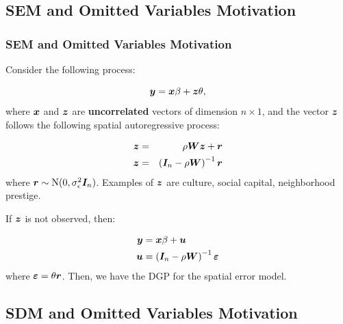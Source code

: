 \documentclass[english,10pt]{beamer}\usepackage[]{graphicx}\usepackage[]{xcolor}
\begin{document}
\subsection{SEM and Omitted Variables Motivation}

\begin{frame}
  \frametitle{SEM and Omitted Variables Motivation}
  Consider the following process:

\begin{equation*}
\bm y = \bm x\beta + \bm z\theta,
\end{equation*}
%
where $\bm x$ and $\bm z$ are \textbf{uncorrelated} vectors of dimension $n\times 1$, and the vector $\bm z$ follows the following spatial autoregressive process:

\begin{eqnarray*}
  \bm z &=& \rho \bm W\bm z + \bm r \\
  \bm z &=& \left(\bm I_n - \rho\bm W\right)^{-1}\bm r
\end{eqnarray*}
%
where $\bm r \sim \mathrm{N}(0, \sigma^2_{\epsilon}\bm I_n)$. Examples of $\bm z$ are culture, social capital, neighborhood prestige. 

If $\bm z$ is not observed, then:


\begin{equation}\label{eq:sem_omited_moti}
  \begin{aligned}
    \bm y & = \bm x\beta + \bm u \\
    \bm u & = \left(\bm I_n - \rho\bm W\right)^{-1}\bm {\varepsilon}
  \end{aligned}
\end{equation}
%
where $\bm {\varepsilon} = \theta\bm r$. Then, we have the DGP for the spatial error model.
\end{frame}

\subsection{SDM and Omitted Variables Motivation}
\end{document}
